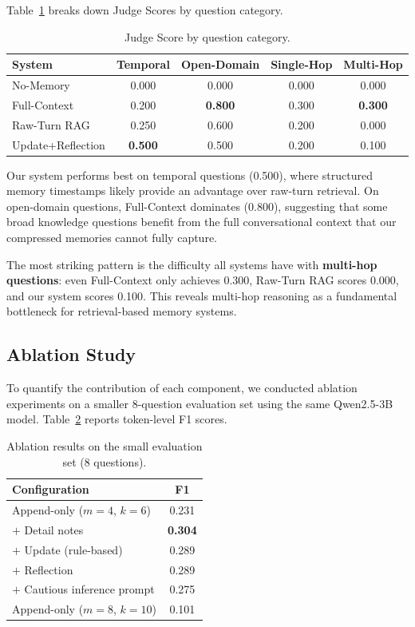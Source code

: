 \documentclass[11pt]{article}
\begin{document}
Table~\ref{tab:bycat} breaks down Judge Scores by question category.

\begin{table}[t]
\centering
\small
\begin{tabular}{lcccc}
\toprule
\textbf{System} & \textbf{Temporal} & \textbf{Open-Domain} & \textbf{Single-Hop} & \textbf{Multi-Hop} \\
\midrule
No-Memory      & 0.000 & 0.000 & 0.000 & 0.000 \\
Full-Context   & 0.200 & \textbf{0.800} & 0.300 & \textbf{0.300} \\
Raw-Turn RAG   & 0.250 & 0.600 & 0.200 & 0.000 \\
Update+Reflection & \textbf{0.500} & 0.500 & 0.200 & 0.100 \\
\bottomrule
\end{tabular}
\caption{Judge Score by question category.}
\label{tab:bycat}
\end{table}

Our system performs best on temporal questions (0.500), where structured memory timestamps likely provide an advantage over raw-turn retrieval. On open-domain questions, Full-Context dominates (0.800), suggesting that some broad knowledge questions benefit from the full conversational context that our compressed memories cannot fully capture.

The most striking pattern is the difficulty all systems have with \textbf{multi-hop questions}: even Full-Context only achieves 0.300, Raw-Turn RAG scores 0.000, and our system scores 0.100. This reveals multi-hop reasoning as a fundamental bottleneck for retrieval-based memory systems.

\subsection{Ablation Study}

To quantify the contribution of each component, we conducted ablation experiments on a smaller 8-question evaluation set using the same Qwen2.5-3B model. Table~\ref{tab:ablation} reports token-level F1 scores.

\begin{table}[t]
\centering
\small
\begin{tabular}{lc}
\toprule
\textbf{Configuration} & \textbf{F1} \\
\midrule
Append-only ($m{=}4$, $k{=}6$) & 0.231 \\
$+$ Detail notes            & \textbf{0.304} \\
$+$ Update (rule-based)     & 0.289 \\
$+$ Reflection              & 0.289 \\
$+$ Cautious inference prompt & 0.275 \\
Append-only ($m{=}8$, $k{=}10$) & 0.101 \\
\bottomrule
\end{tabular}
\caption{Ablation results on the small evaluation set (8 questions).}
\label{tab:ablation}
\end{table}
\end{document}
